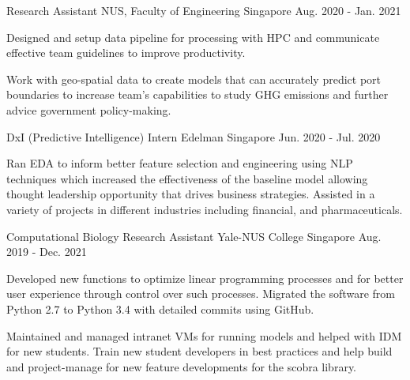 \begin{cventries}
  \cventry
    {Research Assistant} %
    {NUS, Faculty of Engineering} %
    {Singapore} %
    {Aug. 2020 - Jan. 2021} %
    {
      \begin{cvitems} %
        \item {Designed and setup data pipeline for processing with HPC and communicate effective team guidelines to improve productivity.}
        \item {Work with geo-spatial data to create models that can accurately predict port boundaries to increase team’s capabilities to study GHG emissions and further advice government policy-making.}
      \end{cvitems}
    }
    
  \cventry
    {DxI (Predictive Intelligence) Intern} %
    {Edelman} %
    {Singapore} %
    {Jun. 2020 - Jul. 2020} %
    {
      \begin{cvitems} %
        \item {Ran EDA to inform better feature selection and engineering using NLP techniques which increased the effectiveness of the baseline model allowing thought leadership opportunity that drives business strategies.  Assisted in a variety of projects in different industries including financial, and pharmaceuticals.}
      \end{cvitems}
    }
    
  \cventry
    {Computational Biology Research Assistant} %
    {Yale-NUS College} %
    {Singapore} %
    {Aug. 2019 - Dec. 2021} %
    {
      \begin{cvitems} %
        \item {Developed new functions to optimize linear programming processes and for better user experience through control over such processes. Migrated the software from Python 2.7 to Python 3.4 with detailed commits using GitHub.}
        \item {Maintained and managed intranet VMs for running models and helped with IDM for new students.  Train new student developers in best practices and help build and project-manage for new feature developments for the scobra library.}
      \end{cvitems}
    }
\end{cventries}
